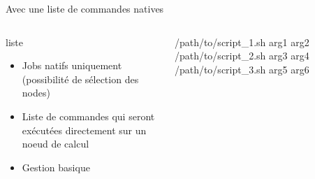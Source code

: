 \documentclass{beamer}
\begin{document}
\begin{frame}{Avec une liste de commandes natives}
	\begin{columns}
	\begin{column}[l]{0.4\linewidth}
        \begin{block}{liste}
            \begin{itemize}
                \item Jobs natifs uniquement (possibilité de sélection des nodes)
                \item Liste de commandes qui seront exécutées directement sur un noeud de calcul
                \item Gestion basique
            \end{itemize}
        \end{block}
	\end{column}
	\begin{column}[r]{0.6\linewidth}
        /path/to/script\_1.sh arg1 arg2\newline
        /path/to/script\_2.sh arg3 arg4\newline
        /path/to/script\_3.sh arg5 arg6\newline
	\end{column}
	\end{columns}
    
\end{frame}
\end{document}
